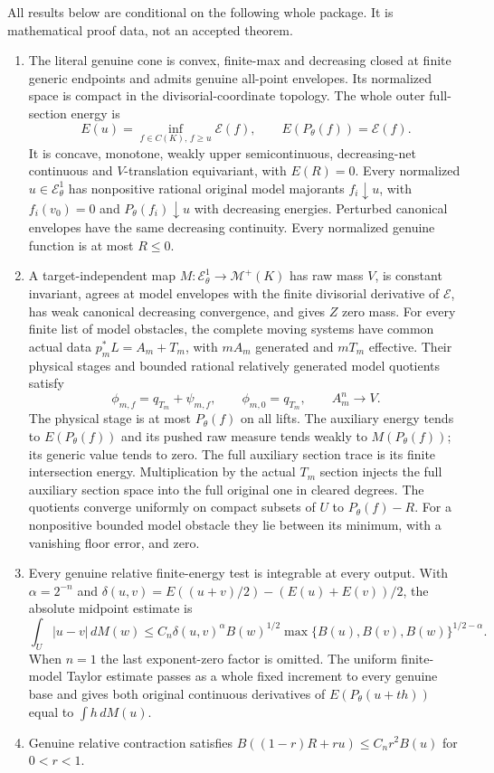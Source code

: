 \documentclass[11pt]{article}
\newcommand{\EE}{\mathcal E^1_\theta}
\begin{document}
All results below are conditional on the following whole package.
It is mathematical proof data, not an accepted theorem.
\begin{enumerate}
\item[(S)] The literal genuine cone is convex, finite-max and decreasing
closed at finite generic endpoints and admits genuine all-point envelopes.
Its normalized space is compact in the divisorial-coordinate topology.
The whole outer full-section energy is
\[
 E(u)=\inf_{f\in C(K),\,f\geq u}\mathscr E(f),
 \qquad E(P_\theta(f))=\mathscr E(f).
\]
It is concave, monotone, weakly upper semicontinuous, decreasing-net
continuous and $V$-translation equivariant, with $E(R)=0$.
Every normalized $u\in\EE$ has nonpositive rational original model
majorants $f_i\downarrow u$, with $f_i(v_0)=0$ and
$P_\theta(f_i)\downarrow u$ with decreasing energies.
Perturbed canonical envelopes have the same decreasing continuity.
Every normalized genuine function is at most $R\leq0$.
\item[(M)] A target-independent map $M:\EE\to\mathcal M^+(K)$ has
raw mass $V$, is constant invariant, agrees at model envelopes with
the finite divisorial derivative of $\mathscr E$, has weak canonical
decreasing convergence, and gives $Z$ zero mass.
For every finite list of model obstacles, the complete moving systems
have common actual data $p_m^*L=A_m+T_m$, with $mA_m$ generated
and $mT_m$ effective. Their physical stages and bounded rational
relatively generated model quotients satisfy
\[
 \phi_{m,f}=q_{T_m}+\psi_{m,f},\qquad
 \phi_{m,0}=q_{T_m},\qquad A_m^n\longrightarrow V .
\]
The physical stage is at most $P_\theta(f)$ on all lifts.
The auxiliary energy tends to $E(P_\theta(f))$ and its pushed raw
measure tends weakly to $M(P_\theta(f))$; its generic value tends to zero.
The full auxiliary section trace is its finite intersection energy.
Multiplication by the actual $T_m$ section injects the full auxiliary
section space into the full original one in cleared degrees.
The quotients converge uniformly on compact subsets of $U$ to
$P_\theta(f)-R$. For a nonpositive bounded model obstacle they lie
between its minimum, with a vanishing floor error, and zero.
\item[(A)] Every genuine relative finite-energy test is integrable at
every output. With $\alpha=2^{-n}$ and
$\delta(u,v)=E((u+v)/2)-(E(u)+E(v))/2$, the absolute midpoint estimate is
\[
 \int_U|u-v|\,dM(w)
 \leq C_n\delta(u,v)^\alpha B(w)^{1/2}
       \max\{B(u),B(v),B(w)\}^{1/2-\alpha}.                 \tag{1}
\]
When $n=1$ the last exponent-zero factor is omitted.
The uniform finite-model Taylor estimate passes as a whole fixed
increment to every genuine base and gives both original continuous
derivatives of $E(P_\theta(u+th))$ equal to $\int h\,dM(u)$.
\item[(C)] Genuine relative contraction satisfies
$B((1-r)R+ru)\leq C_n r^2B(u)$ for $0<r<1$.
\end{enumerate}
\end{document}
